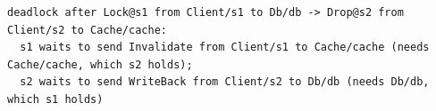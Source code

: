 \begin{lstlisting}[language={},basicstyle=\ttfamily\scriptsize,breaklines=true]
deadlock after Lock@s1 from Client/s1 to Db/db -> Drop@s2 from Client/s2 to Cache/cache:
  s1 waits to send Invalidate from Client/s1 to Cache/cache (needs Cache/cache, which s2 holds);
  s2 waits to send WriteBack from Client/s2 to Db/db (needs Db/db, which s1 holds)
\end{lstlisting}
